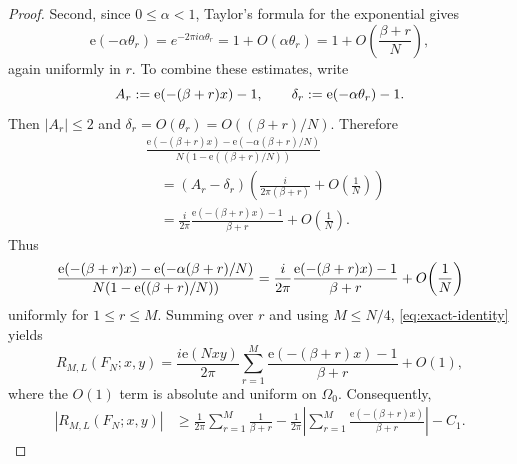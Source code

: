 \documentclass[11pt]{amsart}
\numberwithin{equation}{section}
\newcommand{\et}[1]{\mathrm e\!\left(#1\right)}
\begin{document}
\begin{proof}
Second, since $0\leq \alpha <1$, Taylor's formula for the exponential gives 
\begin{equation*}
\mathrm{e}\!\left( -\alpha \theta _{r}\right) =e^{-2\pi i\alpha \theta
_{r}}=1+O(\alpha \theta _{r})=1+O\!\left( \frac{\beta +r}{N}%
\right) ,
\end{equation*}%
again uniformly in $r$. To combine these estimates, write 
\begin{equation*}
A_{r}:=\mathrm{e}\!\left( -(\beta +r)x\right) -1,\qquad \delta _{r}:=\mathrm{%
e}\!\left( -\alpha \theta _{r}\right) -1.
\end{equation*}%
Then $|A_{r}|\leq 2$ and $\delta _{r}=O(\theta _{r})=O((\beta +r)/N)$.
Therefore 
\begin{equation*}
\begin{aligned} &\frac{\et{-(\beta+r)x}-\et{-\alpha(\beta+r)/N}}
{N(1-\et{(\beta+r)/N})} \\ &\quad = (A_r-\delta_r)
\left(\frac{i}{2\pi(\beta+r)}+O\!\left(\frac1N\right)\right) \\ &\quad
=\frac{i}{2\pi}\frac{\et{-(\beta+r)x}-1}{\beta+r} +O\!\left(\frac1N\right).
\end{aligned}
\end{equation*}
Thus 
\begin{equation*}
\frac{\mathrm{e}\!\left( -(\beta +r)x\right) -\mathrm{e}\!\left( -\alpha
(\beta +r)/N\right) }{N(1-\mathrm{e}\!\left( (\beta +r)/N\right) )}=\frac{i}{%
2\pi }\frac{\mathrm{e}\!\left( -(\beta +r)x\right) -1}{\beta +r}+O\!\left( 
\frac{1}{N}\right)
\end{equation*}%
uniformly for $1\leq r\leq M$. Summing over $r$ and using $M\leq N/4$, %
\eqref{eq:exact-identity} yields 
\begin{equation}
R_{M,L}(F_{N};x,y)=\frac{i\mathrm{e}\!\left( Nxy\right) }{2\pi }%
\sum_{r=1}^{M}\frac{\mathrm{e}\!\left( -(\beta +r)x\right) -1}{\beta +r}%
+O(1),  \label{eq:R-asymptotic}
\end{equation}%
where the $O(1)$ term is absolute and uniform on $\Omega _{0}$.
Consequently, 
\begin{equation}
\begin{aligned} \left|R_{M,L}(F_N;x,y)\right| &\ge
\frac1{2\pi}\sum_{r=1}^{M}\frac1{\beta+r} -\frac1{2\pi}\left|\sum_{r=1}^{M}
\frac{\et{-(\beta+r)x}}{\beta+r}\right|-C_1. \end{aligned}
\label{eq:R-lower-start}
\end{equation}


\end{proof}
\end{document}
